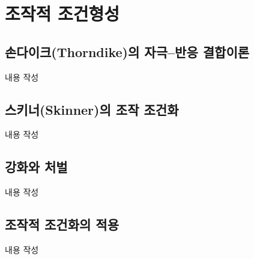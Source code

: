 \section{조작적 조건형성}

\subsection{손다이크(Thorndike)의 자극–반응 결합이론}
내용 작성

\subsection{스키너(Skinner)의 조작 조건화}
내용 작성

\subsection{강화와 처벌}
내용 작성

\subsection{조작적 조건화의 적용}
내용 작성
